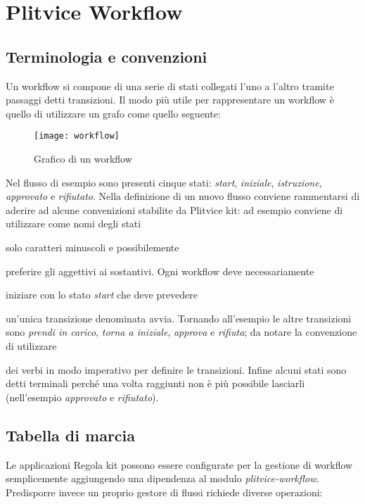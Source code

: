 \chapter{Plitvice Workflow}

\section{Terminologia e convenzioni}
Un workflow si compone di una serie di stati collegati l'uno a l'altro tramite passaggi detti transizioni. Il modo più utile per rappresentare un workflow è quello di utilizzare un grafo come quello seguente:

\begin{figure}[h!]
  \centering
    \texttt{[image: workflow]} 
  \caption[workflow]{Grafico di un workflow \label{fig:workflow}}
\end{figure}

Nel flusso di esempio sono presenti cinque stati: \textit{start}, \textit{iniziale}, \textit{istruzione}, \textit{approvato} e \textit{rifiutato}.  Nella definizione di un nuovo flusso conviene rammentarsi di aderire ad alcune convenizioni stabilite da Plitvice kit: ad esempio conviene di utilizzare come nomi degli stati  
\begin{inparaenum}
\item  solo caratteri minuscoli e possibilemente \item preferire gli aggettivi ai sostantivi. 
Ogni workflow deve necessariamente \item iniziare  con lo stato \textit{start} che deve prevedere  \item un'unica transizione denominata avvia.
Tornando all'esempio le altre transizioni sono \textit{prendi in carico}, \textit{torna a iniziale}, \textit{approva} e \textit{rifiuta}; da notare la convenzione di utilizzare \item dei verbi in modo imperativo per definire le transizioni. 
Infine alcuni stati sono detti terminali perché una volta raggiunti non è più possibile lasciarli (nell'esempio \textit{approvato} e \textit{rifiutato}).
\end{inparaenum}


\section{Tabella di marcia}
Le applicazioni Regola kit possono essere configurate per la gestione di workflow semplicemente aggiungendo una dipendenza al modulo \textit{plitvice-workflow}. Predisporre invece un proprio gestore di flussi richiede diverse operazioni:

